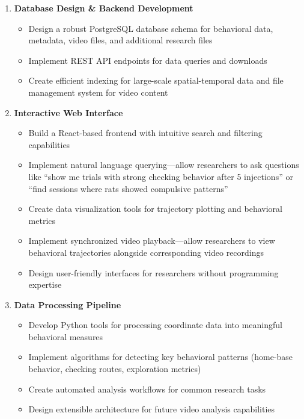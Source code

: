 \documentclass[12pt]{article}
\begin{document}
\begin{enumerate}[label=\arabic*.]
    \item \textbf{Database Design \& Backend Development}
    \begin{itemize}
        \item Design a robust PostgreSQL database schema for behavioral data, metadata, video files, and additional research files
        \item Implement REST API endpoints for data queries and downloads
        \item Create efficient indexing for large-scale spatial-temporal data and file management system for video content
    \end{itemize}

    \item \textbf{Interactive Web Interface}
    \begin{itemize}
        \item Build a React-based frontend with intuitive search and filtering capabilities
        \item Implement natural language querying—allow researchers to ask questions like “show me trials with strong checking behavior after 5 injections” or “find sessions where rats showed compulsive patterns”
        \item Create data visualization tools for trajectory plotting and behavioral metrics
        \item Implement synchronized video playback—allow researchers to view behavioral trajectories alongside corresponding video recordings
        \item Design user-friendly interfaces for researchers without programming expertise
    \end{itemize}

    \item \textbf{Data Processing Pipeline}
    \begin{itemize}
        \item Develop Python tools for processing coordinate data into meaningful behavioral measures
        \item Implement algorithms for detecting key behavioral patterns (home-base behavior, checking routes, exploration metrics)
        \item Create automated analysis workflows for common research tasks
        \item Design extensible architecture for future video analysis capabilities
    \end{itemize}
\end{enumerate}
\end{document}

